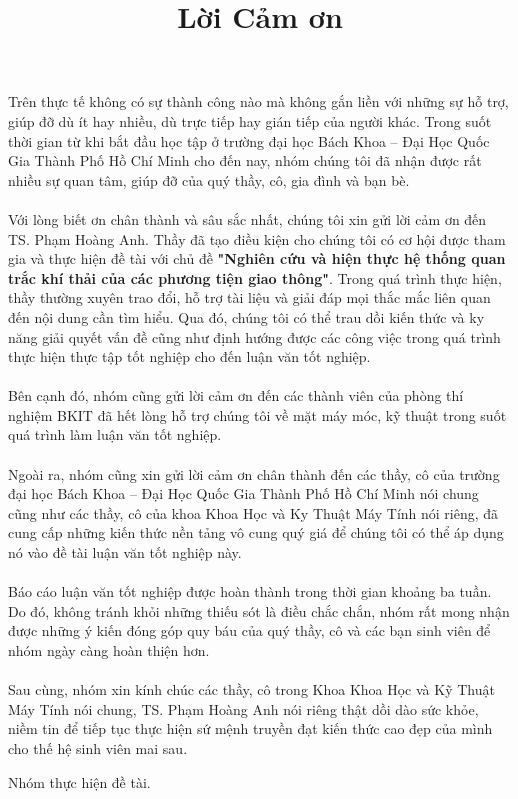 
\begin{acknowledgements}
\title{Lời Cảm ơn}      
Trên thực tế không có sự thành công nào mà không gắn liền với những sự hỗ trợ, giúp đỡ dù ít hay nhiều, dù trực tiếp hay gián tiếp của người khác. Trong suốt thời gian từ khi bắt đầu học tập ở trường đại học Bách Khoa – Đại Học Quốc Gia Thành Phố Hồ Chí Minh cho đến nay, nhóm chúng tôi đã nhận được rất nhiều sự quan tâm, giúp đỡ của quý thầy, cô, gia đình và bạn bè.\\\\
Với lòng biết ơn chân thành và sâu sắc nhất, chúng tôi xin gửi lời cảm ơn đến TS. Phạm Hoàng Anh. Thầy đã tạo điều kiện cho chúng tôi có cơ hội được tham gia và thực hiện đề tài với chủ đề \textbf{"Nghiên cứu và hiện thực hệ thống quan trắc khí thải của các phương tiện giao thông"}. Trong quá trình thực hiện, thầy thường xuyên trao đổi, hỗ trợ tài liệu và giải đáp mọi thắc mắc liên quan đến nội dung cần tìm hiểu. Qua đó, chúng tôi có thể trau dồi kiến thức và ky năng giải quyết vấn đề cũng như định hướng được các công việc trong quá trình thực hiện thực tập tốt nghiệp cho đến luận văn tốt nghiệp.\\\\
Bên cạnh đó, nhóm cũng gửi lời cảm ơn đến các thành viên của phòng thí nghiệm BKIT đã hết lòng hỗ trợ chúng tôi về mặt máy móc, kỹ thuật trong suốt quá trình làm luận văn tốt nghiệp.\\\\
Ngoài ra, nhóm cũng xin gửi lời cảm ơn chân thành đến các thầy, cô của trường đại học Bách Khoa – Đại Học Quốc Gia Thành Phố Hồ Chí Minh nói chung cũng như các thầy, cô của khoa Khoa Học và Ky Thuật Máy Tính nói riêng, đã cung cấp những kiến thức nền tảng vô cung quý giá để chúng tôi có thể áp dụng nó vào đề tài luận văn tốt nghiệp này.\\\\
Báo cáo luận văn tốt nghiệp được hoàn thành trong thời gian khoảng ba tuần. Do đó, không tránh khỏi những thiếu sót là điều chắc chắn, nhóm rất mong nhận được những ý kiến đóng góp quy báu của quý thầy, cô và các bạn sinh viên để nhóm ngày càng hoàn thiện hơn.\\\\
Sau cùng, nhóm xin kính chúc các thầy, cô trong Khoa Khoa Học và Kỹ Thuật Máy Tính nói chung, TS. Phạm Hoàng Anh nói riêng thật dồi dào sức khỏe, niềm tin để tiếp tục thực hiện sứ mệnh truyền đạt kiến thức cao đẹp của mình cho thế hệ sinh viên mai sau.

\begin{flushright}
Nhóm thực hiện đề tài.
\end{flushright} 



\end{acknowledgements}
